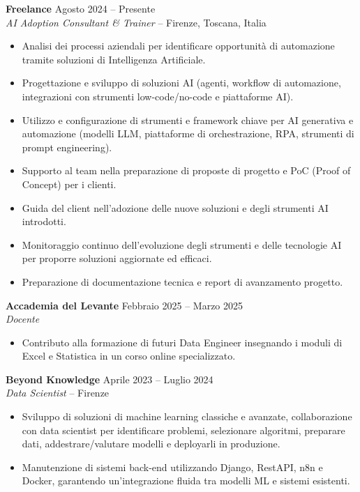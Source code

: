 \documentclass[11pt,a4paper]{article}
\begin{document}
\vspace{4pt}

\textbf{Freelance} \hfill Agosto 2024 -- Presente\\
\textit{AI Adoption Consultant \& Trainer} -- Firenze, Toscana, Italia
\begin{itemize}[leftmargin=*, nosep]
    \item Analisi dei processi aziendali per identificare opportunit\`{a} di automazione tramite soluzioni di Intelligenza Artificiale.
    \item Progettazione e sviluppo di soluzioni AI (agenti, workflow di automazione, integrazioni con strumenti low-code/no-code e piattaforme AI).
    \item Utilizzo e configurazione di strumenti e framework chiave per AI generativa e automazione (modelli LLM, piattaforme di orchestrazione, RPA, strumenti di prompt engineering).
    \item Supporto al team nella preparazione di proposte di progetto e PoC (Proof of Concept) per i clienti.
    \item Guida del client nell'adozione delle nuove soluzioni e degli strumenti AI introdotti.
    \item Monitoraggio continuo dell'evoluzione degli strumenti e delle tecnologie AI per proporre soluzioni aggiornate ed efficaci.
    \item Preparazione di documentazione tecnica e report di avanzamento progetto.
\end{itemize}

\vspace{4pt}

\textbf{Accademia del Levante} \hfill Febbraio 2025 -- Marzo 2025\\
\textit{Docente}
\begin{itemize}[leftmargin=*, nosep]
    \item Contributo alla formazione di futuri Data Engineer insegnando i moduli di Excel e Statistica in un corso online specializzato.
\end{itemize}

\vspace{4pt}

\textbf{Beyond Knowledge} \hfill Aprile 2023 -- Luglio 2024\\
\textit{Data Scientist} -- Firenze
\begin{itemize}[leftmargin=*, nosep]
    \item Sviluppo di soluzioni di machine learning classiche e avanzate, collaborazione con data scientist per identificare problemi, selezionare algoritmi, preparare dati, addestrare/valutare modelli e deployarli in produzione.
    \item Manutenzione di sistemi back-end utilizzando Django, RestAPI, n8n e Docker, garantendo un'integrazione fluida tra modelli ML e sistemi esistenti.
\end{itemize}
\end{document}
